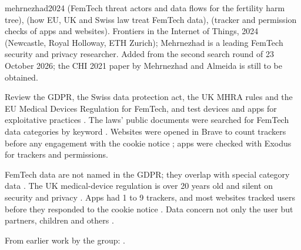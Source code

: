 \begin{papercard}{mehrnezhad2024}
  (FemTech threat actors and data flows for the fertility harm tree),  (how EU, UK and Swiss law treat FemTech data),  (tracker and permission checks of apps and websites). Frontiers in the Internet of Things, 2024 (Newcastle, Royal Holloway, ETH Zurich); Mehrnezhad is a leading FemTech security and privacy researcher. Added from the second search round of 23 October 2026; the CHI 2021 paper by Mehrnezhad and Almeida is still to be obtained.

 Review the GDPR, the Swiss data protection act, the UK MHRA rules and the EU Medical Devices Regulation for FemTech, and test devices and apps for exploitative practices . The laws' public documents were searched for FemTech data categories by keyword . Websites were opened in Brave to count trackers before any engagement with the cookie notice ; apps were checked with Exodus for trackers and permissions.

 FemTech data are not named in the GDPR; they overlap with special category data . The UK medical-device regulation is over 20 years old and silent on security and privacy . Apps had 1 to 9 trackers, and most websites tracked users before they responded to the cookie notice . Data concern not only the user but partners, children and others .

 From earlier work by the group: .


\end{papercard}
